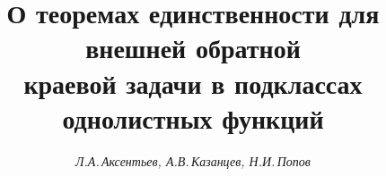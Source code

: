 













\newcommand{\re}{\operatorname{Re}}




\newcommand{\tts}[1]{}










\setcounter{page}{3}












\author{\it Л.А.\,Аксентьев, А.В.\,Казанцев, Н.И.\,Попов}




\title{О теоремах единственности для внешней обратной\\


краевой задачи в подклассах однолистных функций}









\date{}







